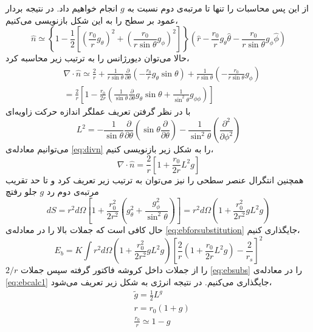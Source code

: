 از این پس محاسبات را تنها تا مرتبه‌ی دوم نسبت به $g$ 
انجام خواهیم داد. در نتیجه بردار عمود بر سطح را به این شکل بازنویسی می‌کنیم،
\begin{equation}
\hat n \simeq\left\{1-\frac{1}{2}\left[\left(\frac{r_0}{r}g_\theta\right)^2+\left(\frac{r_0}{r\sin\theta}g_\phi\right)^2 \right]\right\}\left( \hat r-\frac{r_0}{r}g_\theta \hat\theta-\frac{r_0}{r\sin\theta}g_\phi\hat\phi \right)
\end{equation}
حالا می‌توان دیورژانس را به ترتیب زیر محاسبه کرد،
\begin{equation}
\begin{aligned}
&\nabla\cdot\hat n \simeq \frac{2}{r}+\frac{1}{r\sin\theta}\frac{\partial}{\partial\theta}\left(-\frac{r_0}{r}g_\theta\sin\theta\right)+\frac{1}{r\sin\theta}\left(-\frac{r_0}{r\sin\theta}g_\phi\right)\\
&=\frac{2}{r}\left[1-\frac{r_0}{2r}\left(\frac{1}{\sin\theta}\frac{\partial}{\partial\theta}g_\theta\sin\theta+\frac{1}{\sin^2\theta}g_{\phi\phi}\right)\right]
\label{eq:divn}
\end{aligned}
\end{equation}
با در نظر گرفتن تعریف عملگر اندازه حرکت زاویه‌ای 
\begin{equation}
L^2=-\frac{1}{\sin\theta}\frac{\partial}{\partial\theta}\left(\sin\theta\frac{\partial}{\partial\theta}\right)-\frac{1}{\sin^2\theta}\left(\frac{\partial^2}{\partial\phi^2}\right)
\end{equation}
می‌توانیم معادله‌ی
\ref{eq:divn}
را به شکل زیر بازنویسی کنیم،
\begin{equation}
\nabla\cdot\hat n =\frac{2}{r}\left[1+\frac{r_0}{2r}L^2g\right]
\label{eq:divnL2}
\end{equation}
همچنین انتگرال عنصر سطحی را نیز می‌توان به ترتیب زیر تعریف کرد و تا حد تقریب مرتبه‌ی دوم رد $g$ جلو رفتچ
\begin{equation}
dS=r^2d\Omega\left[1+\frac{r_0^2}{2r^2}\left(g_\theta^2+\frac{g_\phi^2}{\sin^2\theta}\right)\right]=r^2d\Omega\left(1+\frac{r_0^2}{2r^2}gL^2g\right)
\label{eq:dsL2}
\end{equation}
حال کافی است که جملات بالا را در معادله‌ی \ref{eq:ebforsubstitution} جایگذاری کنیم،
\begin{equation}
E_b=K\int r^2d\Omega\left(1+\frac{r_0^2}{2r^2}gL^2g\right)\left[\frac{2}{r}\left(1+\frac{r_0}{2r}L^2g\right)-\frac{2}{r_s}\right]^2
\label{eq:ebcalc1}
\end{equation}
 $2/r$ را از جملات داخل کروشه فاکتور گرفته سپس جملات 
 \ref{eq:ebsubs}
 را در معادله‌ی
 \ref{eq:ebcalc1}
 جایگذاری می‌کنیم‌. در نتیجه انرژی به شکل زیر تعریف می‌شود،
\begin{equation}
\begin{aligned}
&\tilde{g}=\frac{1}{2}L^g\\
&r=r_0(1+g)\\
&\frac{r_0}{r}\simeq 1-g
\label{eq:ebsubs}
\end{aligned}
\end{equation}



